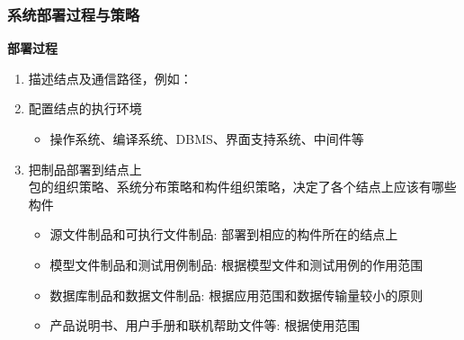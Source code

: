 \documentclass[compress]{beamer}
\begin{document}
\begin{frame}
  \frametitle{系统部署过程与策略}

   {


  \vspace*{2ex}

  \textbf{部署过程}  \\

    \begin{enumerate}
      \item 描述结点及通信路径，例如： \\[2ex]


      \item 配置结点的执行环境
        \begin{itemize}
          \item 操作系统、编译系统、DBMS、界面支持系统、中间件等
        \end{itemize}
    \end{enumerate}
  }

   {
    \begin{enumerate}
        \setcounter{enumi}{2}
      \item 把制品部署到结点上 \\

        包的组织策略、系统分布策略和构件组织策略，决定了各个结点上应该有哪些构件

        \begin{itemize}
          \item 源文件制品和可执行文件制品:
        部署到相应的构件所在的结点上

          \item 模型文件制品和测试用例制品:
        根据模型文件和测试用例的作用范围

          \item 数据库制品和数据文件制品:
        根据应用范围和数据传输量较小的原则

          \item 产品说明书、用户手册和联机帮助文件等:
        根据使用范围 
    \end{itemize}
    \end{enumerate}
  }

\end{frame}
\end{document}
